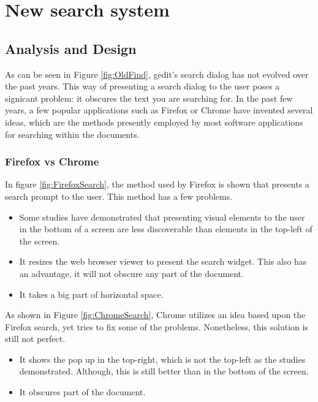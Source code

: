 
\chapter{New search system}

\section{Analysis and Design}


As can be seen in Figure \ref{fig:OldFind}, gedit's search dialog has not evolved over the past years. This way of presenting 
a search dialog to the user poses a signicant problem: it obscures the text you are searching for. In the past few years, a few popular applications 
such as Firefox or Chrome have invented several ideas, which are the methods presently employed by most software applications 
for searching within the documents.

\newpage
\subsection{Firefox vs Chrome}

In figure \ref{fig:FirefoxSearch}, the method used by Firefox is shown that presents a search prompt to the user. This method has a few problems.
\begin{itemize}
  \item Some studies have demonstrated that presenting visual elements to the user in the bottom of a screen are less discoverable 
   than elements in the top-left of the screen.
  \item It resizes the web browser viewer to present the search widget. This also has an advantage, it will not obscure any part of the document.
  \item It takes a big part of horizontal space.
\end{itemize}


As shown in Figure \ref{fig:ChromeSearch}, Chrome utilizes an idea based upon the Firefox search, yet tries to fix some of the problems. Nonetheless, this solution is still not perfect.
\begin{itemize}
  \item It shows the pop up in the top-right, which is not the top-left as the studies demonstrated. Although, this is still better than in the bottom of the screen.
  \item It obscures part of the document.
\end{itemize}

